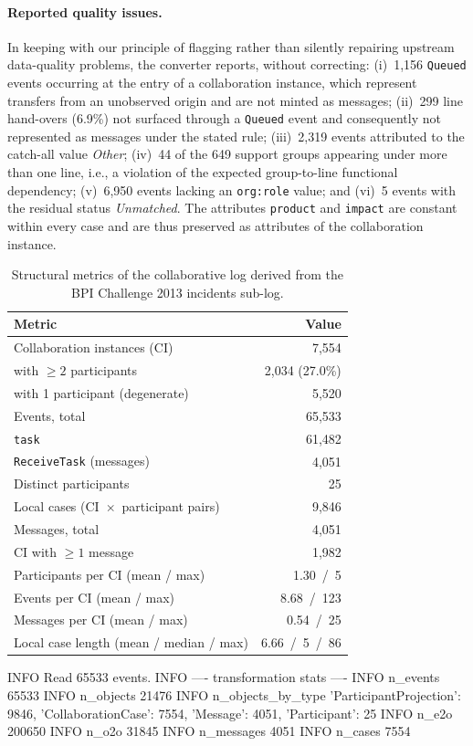 \paragraph{Reported quality issues.}
In keeping with our principle of flagging rather than silently repairing
upstream data-quality problems, the converter reports, without correcting:
(i)~1{,}156 \texttt{Queued} events occurring at the entry of a collaboration
instance, which represent transfers from an unobserved origin and are not
minted as messages; (ii)~299 line hand-overs (6.9\%) not surfaced through a
\texttt{Queued} event and consequently not represented as messages under the
stated rule; (iii)~2{,}319 events attributed to the catch-all value
\emph{Other}; (iv)~44 of the 649 support groups appearing under more than one
line, i.e., a violation of the expected group-to-line functional dependency;
(v)~6{,}950 events lacking an \texttt{org:role} value; and (vi)~5 events with
the residual status \emph{Unmatched}. The attributes \texttt{product} and
\texttt{impact} are constant within every case and are thus preserved as
attributes of the collaboration instance.

\begin{table}[t]
\centering
\caption{Structural metrics of the collaborative log derived from the BPI
Challenge 2013 incidents sub-log.}
\label{tab:bpi2013-collab-metrics}
\begin{tabular}{lr}
\toprule
Metric & Value \\
\midrule
Collaboration instances (CI) & 7{,}554 \\
\quad with $\geq 2$ participants & 2{,}034 (27.0\%) \\
\quad with 1 participant (degenerate) & 5{,}520 \\
Events, total & 65{,}533 \\
\quad \texttt{task} & 61{,}482 \\
\quad \texttt{ReceiveTask} (messages) & 4{,}051 \\
Distinct participants & 25 \\
Local cases (CI~$\times$~participant pairs) & 9{,}846 \\
Messages, total & 4{,}051 \\
CI with $\geq 1$ message & 1{,}982 \\
Participants per CI (mean / max) & 1.30~/~5 \\
Events per CI (mean / max) & 8.68~/~123 \\
Messages per CI (mean / max) & 0.54~/~25 \\
Local case length (mean / median / max) & 6.66~/~5~/~86 \\
\bottomrule
\end{tabular}
\end{table}

INFO Read 65533 events.
INFO ---- transformation stats ----
INFO   n_events               65533
INFO   n_objects              21476
INFO   n_objects_by_type      {'ParticipantProjection': 9846, 'CollaborationCase': 7554, 'Message': 4051, 'Participant': 25}
INFO   n_e2o                  200650
INFO   n_o2o                  31845
INFO   n_messages             4051
INFO   n_cases                7554